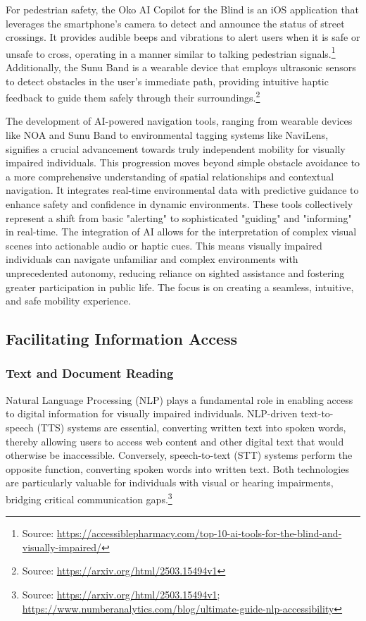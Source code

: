 For pedestrian safety, the Oko AI Copilot for the Blind is an iOS application that leverages the smartphone's camera to detect and announce the status of street crossings. It provides audible beeps and vibrations to alert users when it is safe or unsafe to cross, operating in a manner similar to talking pedestrian signals.\footnote{Source: \url{https://accessiblepharmacy.com/top-10-ai-tools-for-the-blind-and-visually-impaired/}} Additionally, the Sunu Band is a wearable device that employs ultrasonic sensors to detect obstacles in the user's immediate path, providing intuitive haptic feedback to guide them safely through their surroundings.\footnote{Source: \url{https://arxiv.org/html/2503.15494v1}}

The development of AI-powered navigation tools, ranging from wearable devices like NOA and Sunu Band to environmental tagging systems like NaviLens, signifies a crucial advancement towards truly independent mobility for visually impaired individuals. This progression moves beyond simple obstacle avoidance to a more comprehensive understanding of spatial relationships and contextual navigation. It integrates real-time environmental data with predictive guidance to enhance safety and confidence in dynamic environments. These tools collectively represent a shift from basic "alerting" to sophisticated "guiding" and "informing" in real-time. The integration of AI allows for the interpretation of complex visual scenes into actionable audio or haptic cues. This means visually impaired individuals can navigate unfamiliar and complex environments with unprecedented autonomy, reducing reliance on sighted assistance and fostering greater participation in public life. The focus is on creating a seamless, intuitive, and safe mobility experience.

\subsection{Facilitating Information Access}

\subsubsection{Text and Document Reading}

Natural Language Processing (NLP) plays a fundamental role in enabling access to digital information for visually impaired individuals. NLP-driven text-to-speech (TTS) systems are essential, converting written text into spoken words, thereby allowing users to access web content and other digital text that would otherwise be inaccessible. Conversely, speech-to-text (STT) systems perform the opposite function, converting spoken words into written text. Both technologies are particularly valuable for individuals with visual or hearing impairments, bridging critical communication gaps.\footnote{Source: \url{https://arxiv.org/html/2503.15494v1}; \url{https://www.numberanalytics.com/blog/ultimate-guide-nlp-accessibility}}

